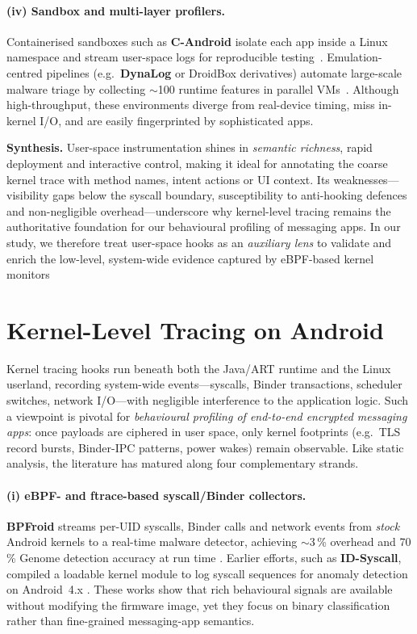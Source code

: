 \documentclass[a4paper,12pt]{report}
\begin{document}
\paragraph{(iv) Sandbox and multi-layer profilers.}
Containerised sandboxes such as \textbf{C-Android} isolate each app inside a
Linux namespace and stream user-space logs for reproducible
testing~\cite{candroid2019}.  Emulation-centred pipelines (e.g.\ \textbf{DynaLog}
or DroidBox derivatives) automate large-scale malware triage by collecting
$\sim$100 runtime features in parallel VMs~\cite{dynalog2016}.  Although
high-throughput, these environments diverge from real-device timing,
miss in-kernel I/O, and are easily fingerprinted by sophisticated apps.

\medskip
\noindent\textbf{Synthesis.}
User-space instrumentation shines in \emph{semantic richness}, rapid
deployment and interactive control, making it ideal for annotating the coarse
kernel trace with method names, intent actions or UI context.  Its
weaknesses—visibility gaps below the syscall boundary, susceptibility to
anti-hooking defences and non-negligible overhead—underscore why kernel-level
tracing remains the authoritative foundation for our behavioural profiling of
messaging apps.  In our study, we therefore treat user-space hooks as an
\emph{auxiliary lens} to validate and enrich the low-level, system-wide evidence
captured by eBPF-based kernel monitors

\section{Kernel-Level Tracing on Android}
\label{sec:rw:kernel}

Kernel tracing hooks run beneath both the Java/ART runtime and the Linux
userland, recording system-wide events---syscalls, Binder transactions,
scheduler switches, network I/O---with negligible interference to the
application logic.  Such a viewpoint is pivotal for \emph{behavioural
profiling of end-to-end encrypted messaging apps}: once payloads are
ciphered in user space, only kernel footprints (e.g.\ TLS record bursts,
Binder-IPC patterns, power wakes) remain observable.  Like static analysis,
the literature has matured along four complementary strands.

\paragraph{(i) eBPF- and ftrace-based syscall/Binder collectors.}
\textbf{BPFroid} streams per-UID syscalls, Binder calls and network events
from \emph{stock} Android kernels to a real-time malware detector, achieving
$\sim$3\,\% overhead and 70\,\% Genome detection accuracy at run time
\cite{agman2021bpfroid}.  Earlier efforts, such as \textbf{ID-Syscall},
compiled a loadable kernel module to log syscall sequences for anomaly
detection on Android~4.x \cite{almuttawa2014syscall}.  These works show that
rich behavioural signals are available without modifying the firmware
image, yet they focus on binary classification rather than fine-grained
messaging-app semantics.
\end{document}
